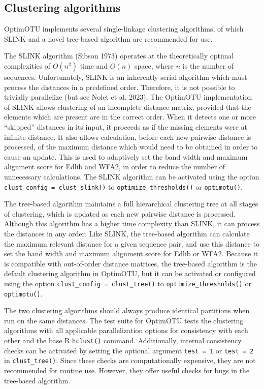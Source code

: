 \documentclass[
]{article}
\begin{document}
\subsection{Clustering algorithms}\label{clustering-algorithms}

OptimOTU implements several single-linkage clustering algorithms, of which SLINK and a novel tree-based algorithm are recommended for use.

The SLINK algorithm (Sibson 1973) operates at the theoretically optimal complexities of \(O(n^2)\) time and \(O(n)\) space, where \(n\) is the number of sequences.
Unfortunately, SLINK is an inherently serial algorithm which must process the distances in a predefined order.
Therefore, it is not possible to trivially parallelize (but see Nolet et al. 2023).
The OptimOTU implementation of SLINK allows clustering of an incomplete distance matrix, provided that the elements which are present are in the correct order.
When it detects one or more ``skipped'' distances in its input, it proceeds as if the missing elements were at infinite distance.
It also allows calculation, before each new pairwise distance is processed, of the maximum distance which would need to be obtained in order to cause an update.
This is used to adaptively set the band width and maximum alignment score for Edlib and WFA2, in order to reduce the number of unnecessary calculations.
The SLINK algorithm can be activated using the option \texttt{clust\_config\ =\ clust\_slink()} to \texttt{optimize\_thresholds()} or \texttt{optimotu()}.

The tree-based algorithm maintains a full hierarchical clustering tree at all stages of clustering, which is updated as each new pairwise distance is processed.
Although this algorithm has a higher time complexity than SLINK, it can process the distances in any order.
Like SLINK, the tree-based algorithm can calculate the maximum relevant distance for a given sequence pair, and use this distance to set the band width and maximum alignment score for Edlib or WFA2.
Because it is compatible with out-of-order distance matrices, the tree-based algorithm is the default clustering algorithm in OptimOTU, but it can be activated or configured using the option \texttt{clust\_config\ =\ clust\_tree()} to \texttt{optimize\_thresholds()} or \texttt{optimotu()}.

The two clustering algorithms should always produce identical partitions when run on the same distances.
The test suite for OptimOTU tests the clustering algorithms with all applicable parallelization options for consistency with each other and the base R \texttt{hclust()} command.
Additionally, internal consistency checks can be activated by setting the optional argument \texttt{test\ =\ 1} or \texttt{test\ =\ 2} in \texttt{clust\_tree()}.
Since these checks are computationally expensive, they are not recommended for routine use.
However, they offer useful checks for bugs in the tree-based algorithm.
\end{document}
